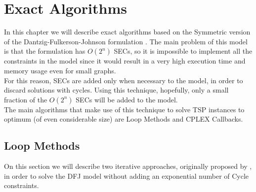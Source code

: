 \chapter{Exact Algorithms}

In this chapter we will describe exact algorithms based on the Symmetric version of the Dantzig-Fulkerson-Johnson formulation \cite{DFJ}. The main problem of this model is that the formulation has $O(2^n)$ SECs, so it is impossible to implement all the constraints in the model since it would result in a very high execution time and memory usage even for small graphs.
\\ For this reason, SECs are added only when necessary to the model, in order to discard solutions with cycles. Using this technique, hopefully, only a small fraction of the $O(2^n)$ SECs will be added to the model.
\\ The main algorithms that make use of this technique to solve TSP instances to optimum (of even considerable size) are Loop Methods and CPLEX Callbacks.

\section{Loop Methods}
On this section we will describe two iterative approaches, originally proposed by \cite{bender}, in order to solve the DFJ model without adding an exponential number of Cycle constraints.
